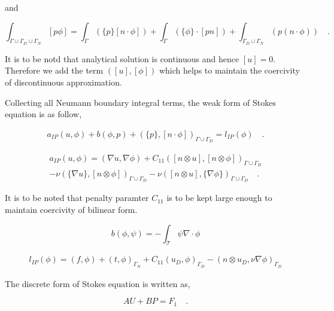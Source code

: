 \documentclass[a4paper,openany]{book}
\begin{document}
and 

\begin{equation}
\int_{\Gamma \cup \Gamma_D \cup \Gamma_N} [p \phi] = \int_{\Gamma} (\lbrace p \rbrace [ n \cdot \phi]) + \int_{\Gamma} (\lbrace \phi \rbrace \cdot [pn]) + \int_{\Gamma_D \cup \Gamma_N} (p (n \cdot \phi) ) \quad \textrm{.}
\end{equation}

It is to be notd that analytical solution is continuous and hence $[u] = 0$. Therefore we add the term $([u],[\phi])$ which helps to maintain the coercivity of discontinuous approximation.


Collecting all Neumann boundary integral terms, the weak form of Stokes equation is as follow,

\begin{equation}\label{stokes_weak_ch3}
\begin{split}
a_{IP}(u,\phi) + b(\phi,p) + (\{p\},[n\cdot \phi])_{\Gamma \cup \Gamma_D} = l_{IP}(\phi) \quad \textrm{.}
\end{split}
\end{equation}

\begin{equation}
\begin{split}
a_{IP}(u,\phi) = (\nabla u, \nabla \phi) + C_{11} ([n \otimes u],[n \otimes \phi])_{\Gamma \cup \Gamma_D} \\
- \nu (\{\nabla u\},[n \otimes \phi])_{\Gamma \cup \Gamma_D} - \nu ([n \otimes u],\{\nabla \phi\})_{\Gamma \cup \Gamma_D} \quad \textrm{.}
\end{split}
\end{equation}

It is to be noted that penalty paramter $C_{11}$ is to be kept large enough to maintain coercivity of bilinear form.

\begin{equation}
b(\phi,\psi) = -\int_{\mathcal{T}} \psi \nabla \cdot \phi
\end{equation}

\begin{equation}
\begin{split}
l_{IP}(\phi) = (f,\phi) + (t,\phi)_{\Gamma_N} + C_{11} (u_D,\phi)_{\Gamma_D} - (n \otimes u_D, \nu \nabla \phi)_{\Gamma_D}
\end{split}
\end{equation}

The discrete form of Stokes equation is written as,

\begin{equation} \label{stokes discrete_ch3}
AU + BP = F_1 \quad \textrm{.}
\end{equation}
\end{document}
